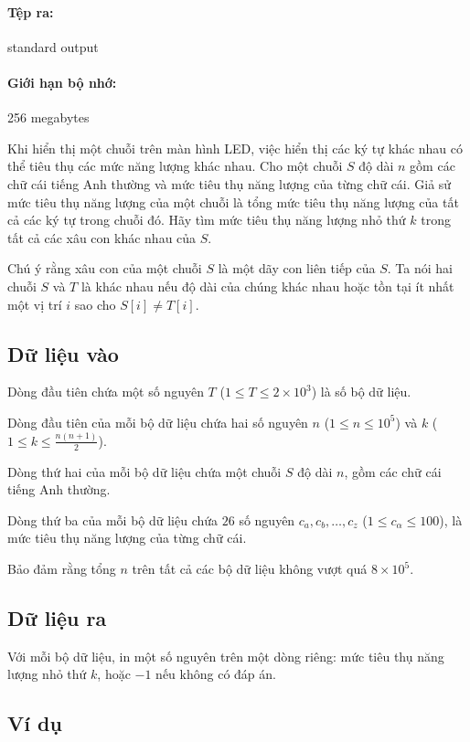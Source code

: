 \documentclass[11pt]{article}
\begin{document}
\paragraph{Tệp ra:} standard output
\paragraph{Giới hạn bộ nhớ:} 256 megabytes

Khi hiển thị một chuỗi trên màn hình LED, việc hiển thị các ký tự khác nhau
có thể tiêu thụ các mức năng lượng khác nhau. Cho một chuỗi \(S\) độ dài
\(n\) gồm các chữ cái tiếng Anh thường và mức tiêu thụ năng lượng của từng
chữ cái. Giả sử mức tiêu thụ năng lượng của một chuỗi là tổng mức tiêu thụ
năng lượng của tất cả các ký tự trong chuỗi đó. Hãy tìm mức tiêu thụ năng
lượng nhỏ thứ \(k\) trong tất cả các xâu con khác nhau của \(S\).

Chú ý rằng xâu con của một chuỗi \(S\) là một dãy con liên tiếp của \(S\). Ta
nói hai chuỗi \(S\) và \(T\) là khác nhau nếu độ dài của chúng khác nhau hoặc
tồn tại ít nhất một vị trí \(i\) sao cho \(S[i]\ne T[i]\).

\subsection*{Dữ liệu vào}

Dòng đầu tiên chứa một số nguyên \(T\) (\(1\le T\le 2\times 10^3\)) là số bộ
dữ liệu.

Dòng đầu tiên của mỗi bộ dữ liệu chứa hai số nguyên \(n\)
(\(1\le n\le 10^5\)) và \(k\)
(\(1\le k\le \frac{n(n+1)}{2}\)).

Dòng thứ hai của mỗi bộ dữ liệu chứa một chuỗi \(S\) độ dài \(n\), gồm các
chữ cái tiếng Anh thường.

Dòng thứ ba của mỗi bộ dữ liệu chứa \(26\) số nguyên
\(c_a,c_b,\ldots,c_z\) (\(1\le c_\alpha\le 100\)), là mức tiêu thụ năng lượng
của từng chữ cái.

Bảo đảm rằng tổng \(n\) trên tất cả các bộ dữ liệu không vượt quá
\(8\times 10^5\).

\subsection*{Dữ liệu ra}

Với mỗi bộ dữ liệu, in một số nguyên trên một dòng riêng: mức tiêu thụ năng
lượng nhỏ thứ \(k\), hoặc \(-1\) nếu không có đáp án.

\subsection*{Ví dụ}
\end{document}
